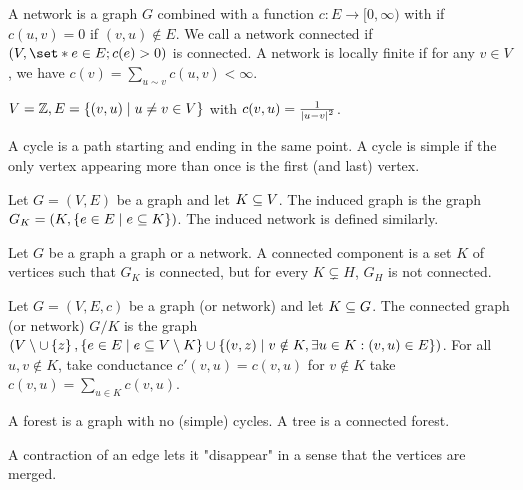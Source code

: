 \begin{defn}[Network]
  A network is a graph $G$ combined with a function $c:E\to [0,\infty)$ with if $c(u,v)=0$ if $(v,u)\notin E$. We call a network connected if $(V, \set*{e\in E; c(e)>0})$ is connected. A network is locally finite if for any \(v\in V\), we have \(c(v) = \sum_{u\sim v}c(u,v)<\infty\).  
\end{defn}


\begin{lem}[Example]
  $V=\mathbb{Z}, E= \left\{ {(v,u) \; \vert \; u\neq v\in V} \right\}$ with $c(v,u)=\frac{1}{\abs{u-v}^2}$.
\end{lem}


\begin{defn}[Cycle]
  A cycle is a path starting and ending in the same point. A cycle is simple if the only vertex appearing more than once is the first (and last) vertex.
\end{defn}


\begin{defn}
  Let $G=(V,E)$ be a graph and let \(K\subseteq V\). The induced graph is the graph \(G_K=(K, \left\{ {e\in E \; \vert \; e \subseteq K} \right\})\). The induced network is defined similarly. 
\end{defn}

\begin{defn}
    Let $G$ be a graph a graph or a network. A connected component is a set $K$ of vertices such that $G_K$ is connected, but for every $K\subsetneq H $, $G_H$ is not connected.
\end{defn}

\begin{defn}
  Let $G=(V,E,c)$ be a graph (or network) and let $K\subseteq G$. The connected graph (or network) $G/K$ is the graph $(V\setminus \cup \left\{ {z} \right\}, \left\{ {e \in E \; \vert \; e \subseteq V\setminus K} \right\} \cup \left\{ {(v,z) \; \vert \; v \notin K, \exists u \in K: (v,u) \in E} \right\})$. For all $u,v \notin K$, take conductance \(c'(v,u) = c(v,u)\) for $v\notin K$ take $c(v,u)=\sum_{u\in K} c(v,u)$.
\end{defn}


\begin{defn}
    A forest is a graph with no (simple) cycles. A tree is a connected forest.
\end{defn}


\begin{remark}
    A contraction of an edge lets it "disappear" in a sense that the vertices are merged.
\end{remark}


